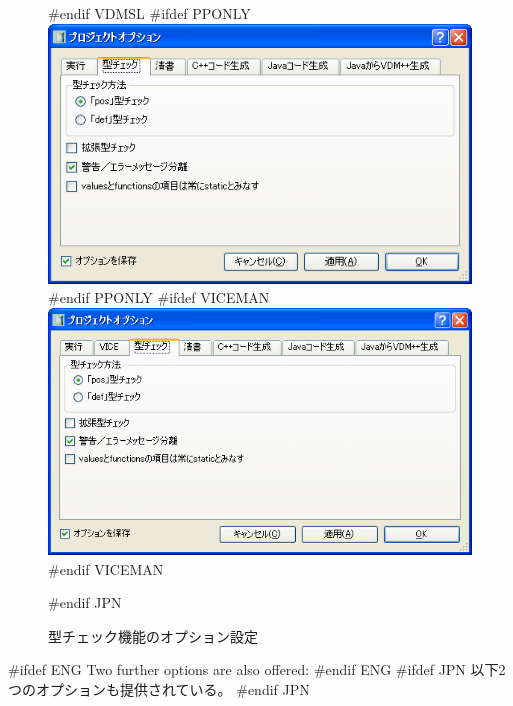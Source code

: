 \documentclass[\pformat,12pt]{article}
\begin{document}
\begin{figure}[tbh]
\begin{center}
#endif VDMSL
#ifdef PPONLY
\includegraphics[width=12cm]{tcOptions-pp.png}
#endif PPONLY
#ifdef VICEMAN
\includegraphics[width=12cm]{tcOptions-vice.png}
#endif VICEMAN
\caption{型チェック機能のオプション設定}
#endif JPN
\label{fig:opttc}
\end{center}
\end{figure}

#ifdef ENG
Two further options are also offered:
#endif ENG
#ifdef JPN
以下2つのオプションも提供されている。
#endif JPN
\end{document}
